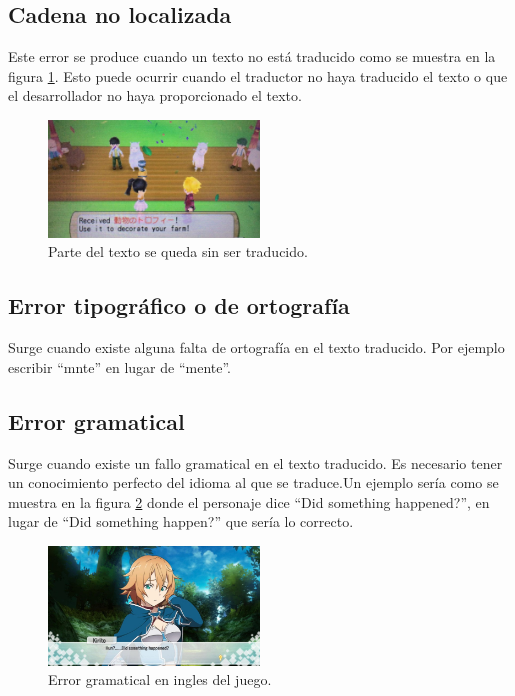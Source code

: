 \subsection{Cadena no localizada}\label{ErrorNoLocalizada}
Este error se produce cuando un texto no está traducido como se muestra en la figura \ref{fig:EImplementacion_Incorrecta}. Esto puede ocurrir cuando el traductor no haya traducido el texto o que el desarrollador no haya proporcionado el texto. 
\begin{figure}[H]
	\centering
	\includegraphics[width = 0.5\textwidth]{Imagenes/Errores_Localizacion/E_Implementacion_Incorrecta.png}
	\caption{Parte del texto se queda sin ser traducido.}
	\label{fig:EImplementacion_Incorrecta}
\end{figure}

\subsection{Error tipográfico o de ortografía}\label{ErrorTypo}
Surge cuando existe alguna falta de ortografía en el texto traducido. Por ejemplo escribir ``mnte'' en lugar de ``mente''.

\subsection{Error gramatical}\label{ErrorGramatical}
Surge cuando existe un fallo gramatical en el texto traducido. Es necesario tener un conocimiento perfecto del idioma al que se traduce.Un ejemplo sería como se muestra en la figura \ref{fig:EGrammar} donde el personaje dice ``Did something happened?'', en lugar de ``Did something happen?'' que sería lo correcto.
\begin{figure}[H]
	\centering
	\includegraphics[width = 0.5\textwidth]{Imagenes/Errores_Localizacion/E_Grammar.png}
	\caption{Error gramatical en ingles del juego.}
	\label{fig:EGrammar}
\end{figure}

